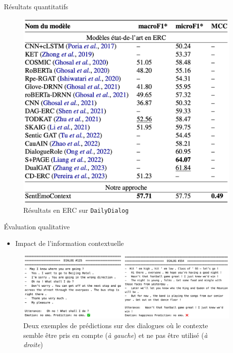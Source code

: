 \documentclass[11pt,aspectratio=169]{beamer}
\begin{document}
\begin{frame}{Résultats quantitatifs}
    \begin{figure}
        \centering
        \includegraphics[scale=0.23]{resultats_sans_llms.png}
        \caption{\centering Résultats en ERC sur \texttt{DailyDialog}}
    \end{figure}
\end{frame}

\begin{frame}{Évaluation qualitative}
    \begin{itemize}
        \item Impact de l'information contextuelle
    \end{itemize}
    \begin{figure}[h]
        \centering
        \includegraphics[width=\textwidth]{hsh.png}
        \caption{\centering Deux exemples de prédictions sur des dialogues où le contexte semble être pris en compte (\textsl{à gauche}) et ne pas être utilisé (\textsl{à droite})}
    \end{figure}
\end{frame}
\end{document}
